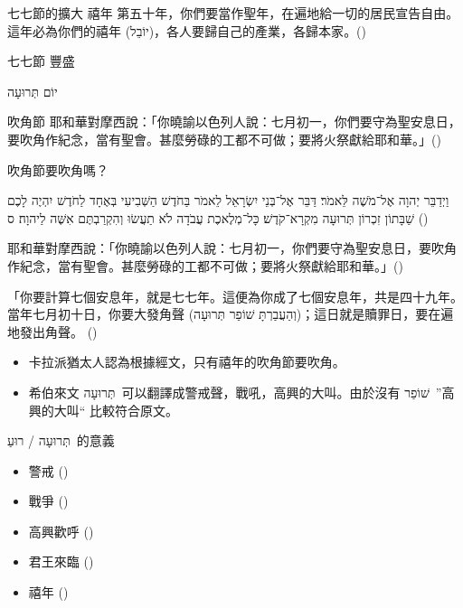 \documentclass{beamer}
\makeatletter
\newcommand{\biblerefhebrew}[1]{\brm@bibleref{hebrew}{#1}}
\newcommand{\topic}[1]{
  \begin{frame}
    \centering
    \vspace*{1cm}
    {\fontsize{40}{48}\selectfont #1\par}
    \vfill
  \end{frame}
}
\newcommand{\conclusion}[2]{
  \begin{frame}
    \centering
    \vspace*{1cm}
    {\fontsize{40}{48}\selectfont #1 \textemdash #2\par}
    \vfill
  \end{frame}
}
\newcommand{\parvspace}{\par\vspace{0.5em}}
\makeatother
\begin{document}
\begin{frame}{七七節的擴大 \textemdash 禧年}
  第五十年，你們要當作\alert{聖年}，在遍地給一切的居民\alert{宣告自由}。這年必為你們的禧年
  (\texthebrew{יוֹבֵל})，各人要\alert{歸自己的產業}，\alert{各歸本家}。()
\end{frame}

\conclusion{七七節}{豐盛}

\topic{\texthebrew{יוֹם תְּרוּעָה}}

\begin{frame}{吹角節}
  耶和華對摩西說：「你曉諭以色列人說：\alert{七月初一}，你們要守為\alert{聖安息日}，要吹角作紀念，當有聖會。甚麼勞碌的工都不可做；要將火祭獻給耶和華。」()\parvspace
\end{frame}

\begin{frame}{吹角節要吹角嗎？}
  \begin{hebrew}וַיְדַבֵּר יְהוָה אֶל־מֹשֶׁה לֵּאמֹר׃ דַּבֵּר
    אֶל־בְּנֵי יִשְׂרָאֵל לֵאמֹר בַּחֹדֶשׁ הַשְּׁבִיעִי בְּאֶחָד
    לַחֹדֶשׁ יִהְיֶה לָכֶם שַׁבָּתוֹן זִכְרוֹן \alert{תְּרוּעָה}
    מִקְרָא־קֹדֶשׁ׃ כָּל־מְלֶאכֶת עֲבֹדָה לֹא תַעֲשׂוּ וְהִקְרַבְתֶּם
    אִשֶּׁה לַיהוָה׃ ס (\biblerefhebrew{Lv 23:23-25})
  \end{hebrew}\parvspace
  耶和華對摩西說：「你曉諭以色列人說：\alert{七月初一}，你們要守為\alert{聖安息日}，要吹角作紀念，當有聖會。甚麼勞碌的工都不可做；要將火祭獻給耶和華。」()\parvspace
  「你要計算七個安息年，就是七七年。這便為你成了七個安息年，共是四十九年。 當年七月初十日，你要\alert{大發角聲
  (\texthebrew{וְהַעֲבַרְתָּ שׁוֹפַר תְּרוּעָה})}；這日就是贖罪日，要在遍地發出角聲。
  ()\parvspace
  \begin{itemize}
    \item 卡拉派猶太人認為根據經文，只有禧年的吹角節要吹角。\parencite{Karaism}
    \item 希伯來文 \texthebrew{תְּרוּעָה}\ 可以翻譯成警戒聲，戰吼，高興的大叫。由於沒有
      \texthebrew{שׁוֹפַר}\ ”高興的大叫“ 比較符合原文。
  \end{itemize}
\end{frame}

\begin{frame}{\texthebrew{תְּרוּעָה / רוּעַ}\ 的意義}
  \begin{itemize}
    \item 警戒 ()
    \item 戰爭 ()
    \item 高興歡呼 ()
    \item 君王來臨 ()
    \item 禧年 ()
  \end{itemize}
\end{frame}
\end{document}
